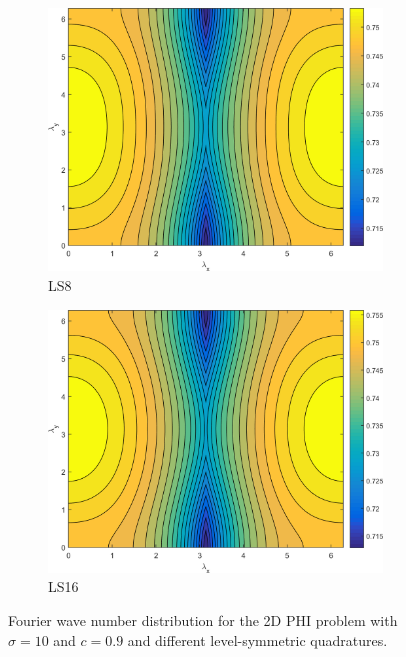 \begin{figure}
{\begin{subfigure}[b]{0.485\textwidth}
		\centering
		\includegraphics[width=0.975\textwidth]{figures/sec_DSA/PHI_SI_MIP_C=4_UPWLD1_LS8_sigt=10_c=9_contour.png}
		\caption{LS8}
	\end{subfigure}
	\hfill
	\begin{subfigure}[b]{0.485\textwidth}
		\centering
		\includegraphics[width=0.975\textwidth]{figures/sec_DSA/PHI_SI_MIP_C=4_UPWLD1_LS16_sigt=10_c=9_contour.png}
		\caption{LS16}
	\end{subfigure}
	}
\caption{Fourier wave number distribution for the 2D PHI problem with $\sigma=10$ and $c=0.9$ and different level-symmetric quadratures.}
\label{fig::PHI_sig=10_c=0.9}
\end{figure}

